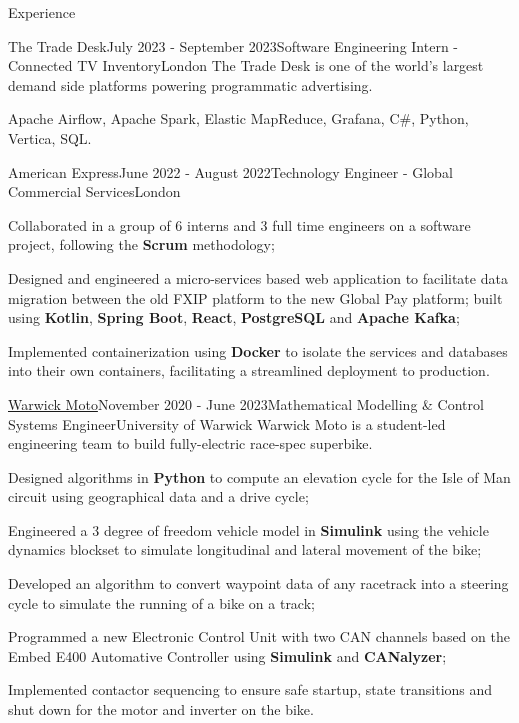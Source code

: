 \documentclass{resume}
\begin{document}
    \begin{rSection}{Experience}
        \begin{rSubsection}{The Trade Desk}{July 2023 - September 2023}{Software Engineering Intern - Connected TV Inventory}{London}
            {The Trade Desk is one of the world's largest demand side platforms powering programmatic advertising.}
            \item Apache Airflow, Apache Spark, Elastic MapReduce, Grafana, C\#, Python, Vertica, SQL. 
        \end{rSubsection}

        \begin{rSubsection}{American Express}{June 2022 - August 2022}{Technology Engineer - Global Commercial Services}{London}{}
            \item Collaborated in a group of 6 interns and 3 full time engineers on a software project, following the \textbf{Scrum} methodology;
            \item Designed and engineered a micro-services based web application to facilitate data migration between the old FXIP platform to the new Global Pay platform; built using \textbf{Kotlin}, \textbf{Spring Boot}, \textbf{React}, \textbf{PostgreSQL} and \textbf{Apache Kafka};
            \item Implemented containerization using \textbf{Docker} to isolate the services and databases into their own containers, facilitating a streamlined deployment to production.
        \end{rSubsection}

        \begin{rSubsection}{{\href{https://warwick.ac.uk/fac/sci/wmg/education/undergraduate/student-projects/warwick-moto/}{Warwick Moto}}}{November 2020 - June 2023}{Mathematical Modelling \& Control Systems Engineer}{University of Warwick}
    {Warwick Moto is a student-led engineering team to build fully-electric race-spec superbike.}
            \item Designed algorithms in \textbf{Python} to compute an elevation cycle for the Isle of Man circuit using geographical data and a drive cycle;
            \item Engineered a 3 degree of freedom vehicle model in \textbf{Simulink} using the vehicle dynamics blockset to simulate longitudinal and lateral movement of the bike;
            \item Developed an algorithm to convert waypoint data of any racetrack into a steering cycle to simulate the running of a bike on a track;
            \item Programmed a new Electronic Control Unit with two CAN channels based on the Embed E400 Automative Controller using \textbf{Simulink} and \textbf{CANalyzer};
            \item Implemented contactor sequencing to ensure safe startup, state transitions and shut down for the motor and inverter on the bike.       
        \end{rSubsection}


\end{rSection}
\end{document}
